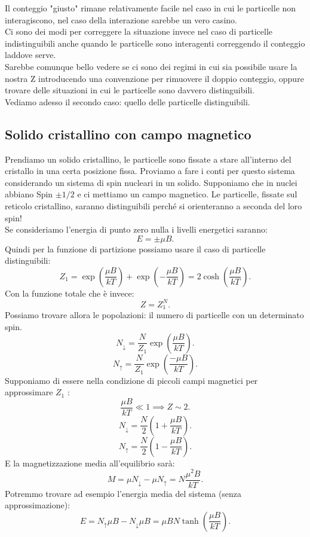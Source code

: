 Il conteggio "giusto" rimane relativamente facile nel caso in cui le particelle non interagiscono, nel caso della interazione sarebbe un vero casino.\\
Ci sono dei modi per correggere la situazione invece nel caso di particelle indistinguibili anche quando le particelle sono interagenti correggendo il conteggio laddove serve.\\
Sarebbe comunque bello vedere se ci sono dei regimi in cui sia possibile usare la nostra Z introducendo una convenzione per rimuovere il doppio conteggio, oppure trovare delle situazioni in cui le particelle sono davvero distinguibili.\\
Vediamo adesso il secondo caso: quello delle particelle distinguibili.\\
\subsection{Solido cristallino con campo magnetico}%
Prendiamo un solido cristallino, le particelle sono fissate a stare all'interno del cristallo in una certa posizione fissa. Proviamo a fare i conti per questo sistema considerando un sistema di spin nucleari in un solido. Supponiamo che in nuclei abbiano Spin $\pm 1 /2$ e ci mettiamo un campo magnetico. Le particelle, fissate sul reticolo cristallino, saranno distinguibili perché si orienteranno a seconda del loro spin!\\
Se consideriamo l'energia di punto zero nulla i livelli energetici saranno:
\[
	E = \pm \mu B
.\] 
Quindi per la funzione di partizione possiamo usare il caso di particelle distinguibili:
\[
	Z_1 = \exp\left( \frac{\mu B}{kT} \right) + \exp \left( - \frac{\mu B}{kT} \right) = 2 \cosh\left( \frac{\mu B}{kT} \right) 
.\] 
Con la funzione totale che è invece:
\[
	Z = Z_1^{N}
.\] 
Possiamo trovare allora le popolazioni: il numero di particelle con un determinato spin.
\[
	N_{\downarrow} = \frac{N}{Z_1}\exp{\left( \frac{\mu B}{kT} \right) }
.\] 
\[
	N_{\uparrow} = \frac{N}{Z_1}\exp{\left( \frac{-\mu B}{kT} \right) }
.\] 
Supponiamo di essere nella condizione di piccoli campi magnetici per approssimare $Z_1$ :
\[
	\frac{\mu B}{kT}\ll 1 \implies Z\sim 2
.\] 
\[
	N_{\downarrow}=\frac{N}{2} \left( 1 + \frac{\mu B}{kT} \right) 
.\] 
\[
	N_{\uparrow}=\frac{N}{2} \left( 1 - \frac{\mu B}{kT} \right) 
.\] 
E la magnetizzazione media all'equilibrio sarà:
\[
	M = \mu N_{\downarrow} -\mu N_{\uparrow}= N \frac{\mu^2 B}{kT}
.\] 
Potremmo trovare ad esempio l'energia media del sistema (senza approssimazione):
\[
	E = N_{\uparrow}\mu B- N_{\downarrow} \mu B = \mu B N \tanh \left( \frac{\mu B}{kT} \right) 
.\]  
